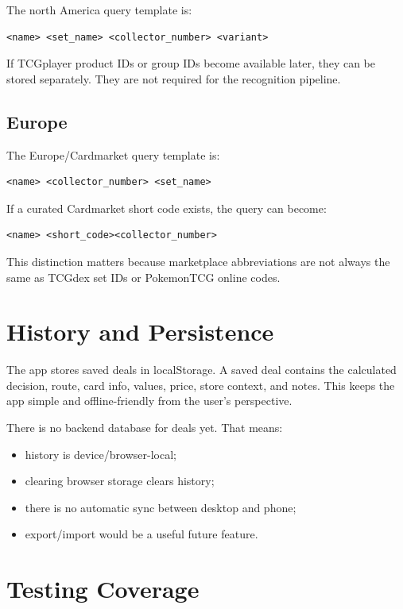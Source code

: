 \documentclass[11pt,a4paper]{article}
\begin{document}
The north America query template is:

\begin{lstlisting}
<name> <set_name> <collector_number> <variant>
\end{lstlisting}

If TCGplayer product IDs or group IDs become available later, they can be stored separately. They are not required for the recognition pipeline.

\subsection{Europe}

The Europe/Cardmarket query template is:

\begin{lstlisting}
<name> <collector_number> <set_name>
\end{lstlisting}

If a curated Cardmarket short code exists, the query can become:

\begin{lstlisting}
<name> <short_code><collector_number>
\end{lstlisting}

This distinction matters because marketplace abbreviations are not always the same as TCGdex set IDs or PokemonTCG online codes.

\section{History and Persistence}

The app stores saved deals in localStorage. A saved deal contains the calculated decision, route, card info, values, price, store context, and notes. This keeps the app simple and offline-friendly from the user's perspective.

There is no backend database for deals yet. That means:

\begin{itemize}
  \item history is device/browser-local;
  \item clearing browser storage clears history;
  \item there is no automatic sync between desktop and phone;
  \item export/import would be a useful future feature.
\end{itemize}

\section{Testing Coverage}
\end{document}
